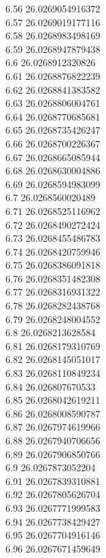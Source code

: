 {6.56	26.0269054916372\\
6.57	26.0269019177116\\
6.58	26.0268983498169\\
6.59	26.0268947879438\\
6.6	26.0268912320826\\
6.61	26.0268876822239\\
6.62	26.0268841383582\\
6.63	26.0268806004761\\
6.64	26.0268770685681\\
6.65	26.0268735426247\\
6.66	26.0268700226367\\
6.67	26.0268665085944\\
6.68	26.0268630004886\\
6.69	26.0268594983099\\
6.7	26.0268560020489\\
6.71	26.0268525116962\\
6.72	26.0268490272424\\
6.73	26.0268455486783\\
6.74	26.0268420759946\\
6.75	26.0268386091818\\
6.76	26.0268351482308\\
6.77	26.0268316931322\\
6.78	26.0268282438768\\
6.79	26.0268248004552\\
6.8	26.0268213628584\\
6.81	26.0268179310769\\
6.82	26.0268145051017\\
6.83	26.0268110849234\\
6.84	26.026807670533\\
6.85	26.0268042619211\\
6.86	26.0268008590787\\
6.87	26.0267974619966\\
6.88	26.0267940706656\\
6.89	26.0267906850766\\
6.9	26.0267873052204\\
6.91	26.0267839310881\\
6.92	26.0267805626704\\
6.93	26.0267771999583\\
6.94	26.0267738429427\\
6.95	26.0267704916146\\
6.96	26.0267671459649\\
}
